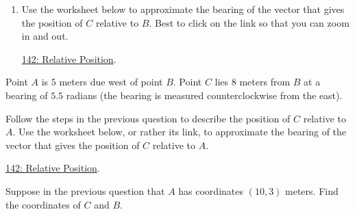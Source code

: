 \documentclass{ximera}
\begin{document}
\begin{question}
\begin{enumerate}
\item Use the worksheet below to approximate the bearing  of the vector that gives the position of $C$ relative to $B$. Best to click on the link so that you can zoom in and out.

\href{https://www.geogebra.org/classic/bhdsgxtx}{142: Relative Position}.

 
\begin{onlineOnly}
    \begin{center}
\end{center}
\end{onlineOnly}
\end{enumerate}
\end{question}

\begin{question}  \label{Q9dferevdeewDSFD}
Point $A$ is $5$ meters due west of point $B$. Point $C$ lies $8$ meters from $B$ at a bearing of $5.5$ radians (the bearing is measured counterclockwise from the east).

Follow the steps in the previous question to describe the position of $C$ relative to $A$.  Use the worksheet below, or rather its link, to approximate the bearing of the vector that gives the position of $C$ relative to $A$.

\href{https://www.geogebra.org/classic/bhdsgxtx}{142: Relative Position}.

 
\begin{onlineOnly}
    \begin{center}
\end{center}
\end{onlineOnly}

\end{question}

\begin{question}  \label{QERERER435r}
Suppose in the previous question that $A$ has coordinates $(10,3)$ meters. Find the coordinates of $C$ and $B$.

\end{question}
\end{document}
